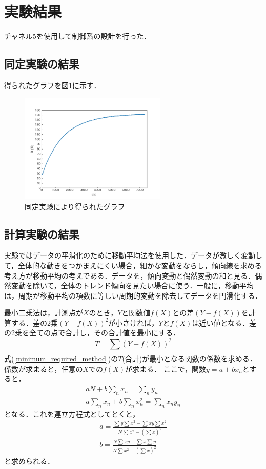 \documentclass[12pt]{jsarticle}
\begin{document}
\section{実験結果}
チャネル5を使用して制御系の設計を行った．
\subsection{同定実験の結果}
得られたグラフを図\ref{identification_EXP}に示す．
\begin{figure}[tb]
  \begin{center}
    \includegraphics[clip,width=7.0cm]{../graph/identification.png}
    \caption{同定実験により得られたグラフ}
    \label{identification_EXP}
  \end{center}
\end{figure}

\subsection{計算実験の結果}
実験ではデータの平滑化のために移動平均法を使用した．データが激しく変動して，全体的な動きをつかまえにくい場合，細かな変動をならし，傾向線を求める考え方が移動平均の考えである．データを，傾向変動と偶然変動の和と見る．偶然変動を除いて，全体のトレンド傾向を見たい場合に使う．一般に，移動平均は，周期が移動平均の項数に等しい周期的変動を除去してデータを円滑化する\cite{moving_average}．

最小二乗法は，計測点が$X$のとき，$Y$と関数値$f(X)$との差$(Y-f(X))$を計算する．差の2乗$(Y-f(X))^2$が小さければ，$Y$と$f(X)$は近い値となる．差の2乗を全ての点で合計し，その合計値を最小にする．
\begin{equation}
  \label{minimum_required_method}
  T = \sum_{}^{}(Y-f(X))^2
\end{equation}
式(\ref{minimum_required_method})の$T$(合計)が最小となる関数の係数を求める．係数が求まると，任意の$X$での$f(X)$が求まる\cite{minimum_method}．
ここで，関数$y = a + bx_n$とすると，
\begin{eqnarray}
  \label{minimum_method}
  aN + b\sum_{n}^{}x_n = \sum_{n}^{}y_n \\
  a\sum_{n}^{}x_n + b\sum_{n}^{}x_n^2 = \sum_{n}^{}x_ny_n
\end{eqnarray}
となる．これを連立方程式としてとくと，
\begin{eqnarray}
a = \frac{\sum{}^{}y \sum{}^{}x^2 - \sum{}^{}xy\sum{}^{}x^2}{N\sum_{}^{}x^2 - (\sum_{}^{}x)^2}\\
b = \frac{N\sum{}^{}xy - \sum{}^{}x\sum{}^{}y}{N\sum_{}^{}x^2 - (\sum_{}^{}x)^2}
\end{eqnarray}
と求められる．
\end{document}
